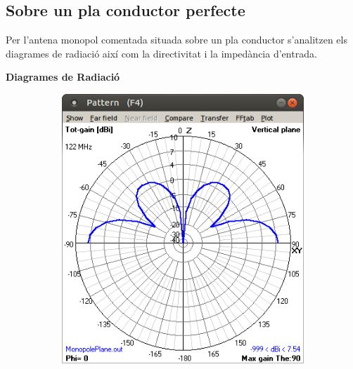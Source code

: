 \newpage
\subsection{Sobre un pla conductor perfecte}

  Per l'antena monopol comentada situada sobre un pla conductor s'analitzen els diagrames de radiació així com la directivitat i la impedància d'entrada.

 \textbf{Diagrames de Radiació}

 	\begin{figure}[H]
	\centering
	  \begin{subfigure}[b]{0.32\textwidth}
	  \includegraphics[width=\textwidth]{./images/4.Monopole_plane/vertical.png}
	  \caption{}
	  \label{2diag1}
	  \end{subfigure}
	  \qquad %
	  \begin{subfigure}[b]{0.32\textwidth}

\end{subfigure}
\end{figure}
